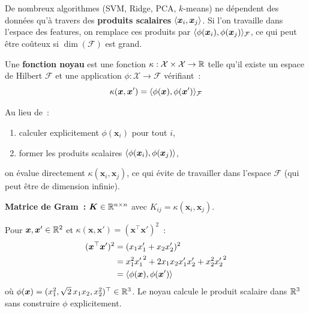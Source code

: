 De nombreux algorithmes (SVM, Ridge, PCA, $k$-means) ne d\'ependent des
donn\'ees qu'\`a travers des \textbf{produits scalaires}
$\langle \bm{x}_i, \bm{x}_j \rangle$. Si l'on travaille dans l'espace des
features, on remplace ces produits par
$\langle \phi(\bm{x}_i), \phi(\bm{x}_j) \rangle_{\mathcal{F}}$, ce qui peut
\^etre co\^uteux si $\dim(\mathcal{F})$ est grand.

\begin{definition}
\label{def:kernel}
Une \textbf{fonction noyau} est une fonction
$\kappa : \mathcal{X} \times \mathcal{X} \to \mathbb{R}$ telle qu'il existe un
espace de Hilbert $\mathcal{F}$ et une application
$\phi : \mathcal{X} \to \mathcal{F}$ v\'erifiant~:
\begin{equation}
  \kappa(\bm{x}, \bm{x}') = \langle \phi(\bm{x}), \phi(\bm{x}') \rangle_{\mathcal{F}}
  \label{eq:kernel-def}
\end{equation}
\end{definition}

\begin{formules}[title=\textbf{L'astuce du noyau}]
Au lieu de~:
\begin{enumerate}
  \item calculer explicitement $\phi(\bm{x}_i)$ pour tout $i$,
  \item former les produits scalaires $\langle \phi(\bm{x}_i), \phi(\bm{x}_j) \rangle$,
\end{enumerate}
on \'evalue directement $\kappa(\bm{x}_i, \bm{x}_j)$, ce qui \'evite de
travailler dans l'espace $\mathcal{F}$ (qui peut \^etre de dimension infinie).

\textbf{Matrice de Gram~:} $\bm{K} \in \mathbb{R}^{n \times n}$ avec
$K_{ij} = \kappa(\bm{x}_i, \bm{x}_j)$.
\end{formules}

\begin{exemple}
Pour $\bm{x}, \bm{x}' \in \mathbb{R}^2$ et $\kappa(\bm{x}, \bm{x}') =
(\bm{x}^\top \bm{x}')^2$~:
\begin{align}
  (\bm{x}^\top \bm{x}')^2 &= (x_1 x_1' + x_2 x_2')^2 \\
  &= x_1^2 {x_1'}^2 + 2 x_1 x_2 x_1' x_2' + x_2^2 {x_2'}^2 \\
  &= \langle \phi(\bm{x}), \phi(\bm{x}') \rangle
\end{align}
o\`u $\phi(\bm{x}) = (x_1^2, \sqrt{2}\, x_1 x_2, x_2^2)^\top \in \mathbb{R}^3$.
Le noyau calcule le produit scalaire dans $\mathbb{R}^3$ sans construire $\phi$
explicitement.
\end{exemple}

